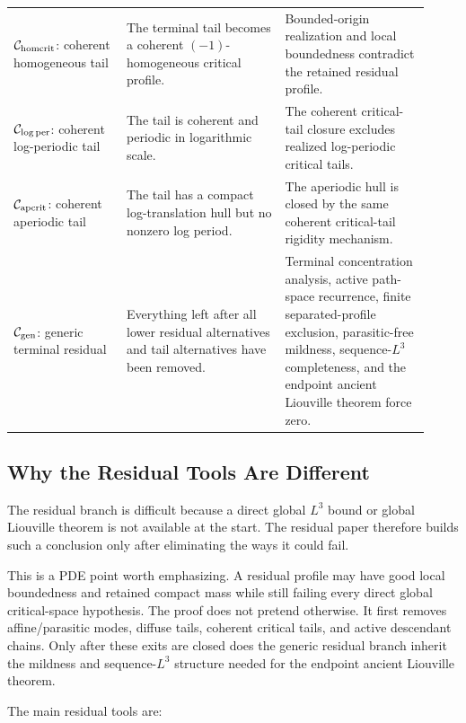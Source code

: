 \documentclass[11pt]{amsart}
\begin{document}
\begin{longtable}{@{}>{\raggedright\arraybackslash}p{0.25\linewidth}>{\raggedright\arraybackslash}p{0.35\linewidth}>{\raggedright\arraybackslash}p{0.32\linewidth}@{}}
\(\mathcal C_{\rm homcrit}\): coherent homogeneous tail & The terminal tail becomes a coherent \((-1)\)-homogeneous critical profile. & Bounded-origin realization and local boundedness contradict the retained residual profile. \\
\(\mathcal C_{\log\rm per}\): coherent log-periodic tail & The tail is coherent and periodic in logarithmic scale. & The coherent critical-tail closure excludes realized log-periodic critical tails. \\
\(\mathcal C_{\rm apcrit}\): coherent aperiodic tail & The tail has a compact log-translation hull but no nonzero log period. & The aperiodic hull is closed by the same coherent critical-tail rigidity mechanism. \\
\(\mathcal C_{\rm gen}\): generic terminal residual & Everything left after all lower residual alternatives and tail alternatives have been removed. & Terminal concentration analysis, active path-space recurrence, finite separated-profile exclusion, parasitic-free mildness, sequence-\(L^3\) completeness, and the endpoint ancient Liouville theorem force zero. \\
\bottomrule
\end{longtable}

\subsection{Why the Residual Tools Are Different}

The residual branch is difficult because a direct global \(L^3\) bound or global Liouville theorem is not available at the start.  The residual paper therefore builds such a conclusion only after eliminating the ways it could fail.

This is a PDE point worth emphasizing.  A residual profile may have good local boundedness and retained compact mass while still failing every direct global critical-space hypothesis.  The proof does not pretend otherwise.  It first removes affine/parasitic modes, diffuse tails, coherent critical tails, and active descendant chains.  Only after these exits are closed does the generic residual branch inherit the mildness and sequence-\(L^3\) structure needed for the endpoint ancient Liouville theorem.

The main residual tools are:
\end{document}
